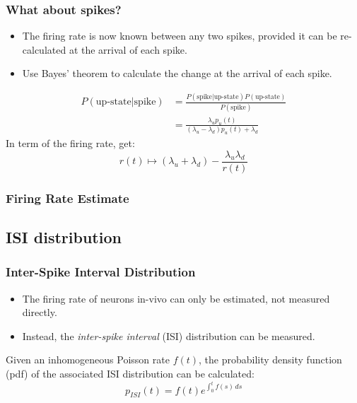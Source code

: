 \documentclass{beamer}
\begin{document}
\begin{frame}
\frametitle{What about spikes?}
\pause
\begin{itemize}
\item The firing rate is now known between any two spikes, provided it can be re-calculated at the arrival of each spike.
\pause
\item Use Bayes' theorem to calculate the change at the arrival of each spike.
\end{itemize}
\begin{equation*}
\begin{split}
P(\mbox{up-state} | \mbox{spike}) &= \frac{P(\mbox{spike}|\mbox{up-state})P(\mbox{up-state})}{P(\mbox{spike})} \\
&=\frac{\lambda_u p_u(t)}{(\lambda_u - \lambda_d) p_u(t) + \lambda_d }
\end{split}
\end{equation*}
\pause
In term of the firing rate, get:
\begin{equation}
r(t) \mapsto (\lambda_u + \lambda_d) - \frac{\lambda_u\lambda_d}{r(t)}
\end{equation}
\end{frame}

\begin{frame}
\frametitle{Firing Rate Estimate}
\begin{center}
\resizebox{0.8\textwidth}{!}{}
\end{center}
\end{frame}

\subsection{ISI distribution}
\begin{frame}
\frametitle{Inter-Spike Interval Distribution}
\begin{itemize}
\item The firing rate of neurons in-vivo can only be estimated, not measured directly.
\pause
\item Instead, the \emph{inter-spike interval} (ISI) distribution can be measured.
\end{itemize}
\pause
Given an inhomogeneous Poisson rate $f(t)$, the probability density function (pdf) of the associated ISI distribution can be calculated:
\begin{equation*}
p_{ISI}(t) = f(t) e^{\int_0^t f(s)\, ds}
\end{equation*}
\end{frame}
\end{document}
